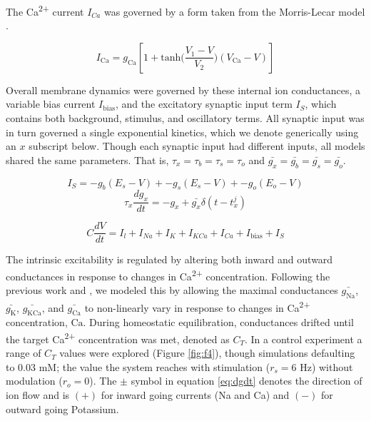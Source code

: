 \documentclass{article}
\begin{document}
The Ca\textsuperscript{2+} current $I_{Ca}$ was governed by a form taken from the Morris-Lecar model \cite{Morris1981,LeMasson1993,Siegel1994}.

\begin{equation}
I_\text{Ca} = g_\text{Ca} [1 + \text{tanh} \Big ( \frac{V_1 - V}{ V_2} \Big ) (V_\text{Ca} - V)]
\end{equation}

Overall membrane dynamics were governed by these internal ion conductances, a variable bias current $I_\text{bias}$, and the excitatory synaptic input term $I_S$, which contains both background, stimulus, and oscillatory terms. All synaptic input was in turn governed a single exponential kinetics, which we denote generically using an $x$ subscript below. Though each synaptic input had different inputs, all models shared the same parameters. That is, $\tau_x = \tau_b = \tau_s = \tau_o$ and $\bar{g_x} = \bar{g_b} = \bar{g_s} = \bar{g_o}$.

\begin{equation}
    I_S = -g_b (E_s - V) + -g_s (E_s - V) + -g_o (E_o - V) 
\end{equation}
\begin{equation}
    \tau_x \frac{dg_x}{dt} = -g_x + \bar{g_x} \delta(t - t_x^j)
\end{equation}

\begin{equation}
C \frac{dV}{dt} = I_l + I_{Na} + I_{K} + I_{KCa} + I_{Ca} + I_{\text{bias}} + I_S
\end{equation}

The intrinsic excitability is regulated by altering both inward and outward conductances in response to changes in Ca\textsuperscript{2+} concentration. Following the previous work \cite{LeMasson1993} and \cite{Siegel1994}, we modeled this by allowing the maximal conductances $\bar{g_\text{Na}}$, $\bar{g_\text{K}}$, $\bar{g_\text{KCa}}$, and $\bar{g_\text{Ca}}$ to non-linearly vary in response to changes in Ca\textsuperscript{2+} concentration, $\text{Ca}$. During homeostatic equilibration, conductances drifted until the target Ca\textsuperscript{2+} concentration was met, denoted as $C_T$. In a control experiment a range of $C_T$ values were explored (Figure \ref{fig:f4}), though simulations defaulting to 0.03 mM; the value the system reaches with stimulation ($r_s = 6$ Hz) without modulation ($r_o = 0$). The $\pm$ symbol in equation \ref{eq:dgdt} denotes the direction of ion flow and is $(+)$ for inward going currents (Na and Ca) and $(-)$ for outward going Potassium.
\end{document}
